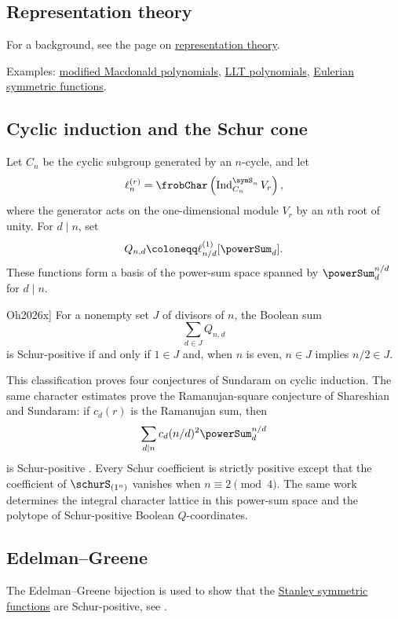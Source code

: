 \subsection[schurPositivityRep]{Representation theory}

For a background, see the page on \hyperref[representationTheory]{representation theory}.

Examples: \hyperref[macdonaldH]{modified Macdonald polynomials},
\hyperref[LLT]{LLT polynomials}, \hyperref[eulerianSymmetric]{Eulerian symmetric functions}.

\subsection[cyclicInductionSchurCone]{Cyclic induction and the Schur cone}

Let $C_n$ be the cyclic subgroup generated by an $n$-cycle, and let
\[
  \ell_n^{(r)}
  =
  \frobChar\left(\operatorname{Ind}_{C_n}^{\symS_n}V_r\right),
\]
where the generator acts on the one-dimensional module $V_r$ by an $n$th
root of unity.  For $d\mid n$, set
\[
  Q_{n,d}\coloneqq \ell_{n/d}^{(1)}[\powerSum_d].
\]
These functions form a basis of the power-sum space spanned by
$\powerSum_d^{n/d}$ for $d\mid n$.

\begin{theorem}[Oh, \cite[Thm.~4.6]{Oh2026x}]
For a nonempty set $J$ of divisors of $n$, the Boolean sum
\[
  \sum_{d\in J}Q_{n,d}
\]
is Schur-positive if and only if $1\in J$ and, when $n$ is even,
$n\in J$ implies $n/2\in J$.
\end{theorem}

This classification proves four conjectures of Sundaram on cyclic induction.
The same character estimates prove the Ramanujan-square conjecture of
Shareshian and Sundaram: if $c_d(r)$ is the Ramanujan sum, then
\[
  \sum_{d\mid n}c_d(n/d)^2\powerSum_d^{n/d}
\]
is Schur-positive \cite[Thm.~6.6]{Oh2026x}.  Every Schur coefficient is
strictly positive except that the coefficient of $\schurS_{(1^n)}$ vanishes
when $n\equiv2\pmod4$.  The same work determines the integral character
lattice in this power-sum space and the polytope of Schur-positive Boolean
$Q$-coordinates.



\subsection[schurPositivityEG]{Edelman--Greene}

The Edelman--Greene bijection is used to show that the
\hyperref[stanleySymAffineSchurExpansion]{Stanley symmetric functions} are Schur-positive,
see \cite{EdelmanGreene1987}.




